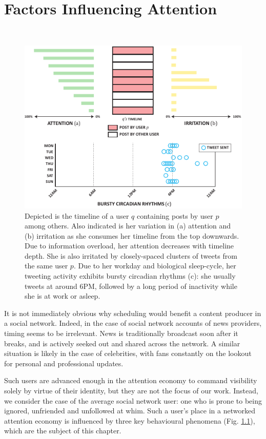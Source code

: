 \documentclass[onesided,asymmetric]{tufte-book}
\begin{document}
\chapter{Factors Influencing Attention}
\label{ch:factors}
\\[-1pc]
\begin{figure}%
  \includegraphics[width=\linewidth]{phenomena}
  \caption[Factors influencing attention.]{Depicted is the timeline of a user $q$ containing posts by user $p$ among others. Also indicated is her variation in (a) attention and (b) irritation as she consumes her timeline from the top downwards. Due to information overload, her attention decreases with timeline depth. She is also irritated by closely-spaced clusters of tweets from the same user $p$. Due to her workday and biological sleep-cycle, her tweeting activity exhibits bursty circadian rhythms (c): she usually tweets at around 6PM, followed by a long period of inactivity while she is at work or asleep.}
  \label{fig:phenomena}
\end{figure}

It is not immediately obvious why scheduling would benefit a content producer in a social network. Indeed, in the case of social network accounts of news providers, timing seems to be irrelevant. News is traditionally broadcast soon after it breaks, and is actively seeked out and shared across the network. A similar situation is likely in the case of celebrities, with fans constantly on the lookout for personal and professional updates.

Such users are advanced enough in the attention economy to command visibility solely by virtue of their identity, but they are not the focus of our work. Instead, we consider the case of the average social network user: one who is prone to being ignored, unfriended and unfollowed at whim. Such a user's place in a networked attention economy is influenced by three key behavioural phenomena (Fig. \ref{fig:phenomena}), which are the subject of this chapter.
\end{document}
